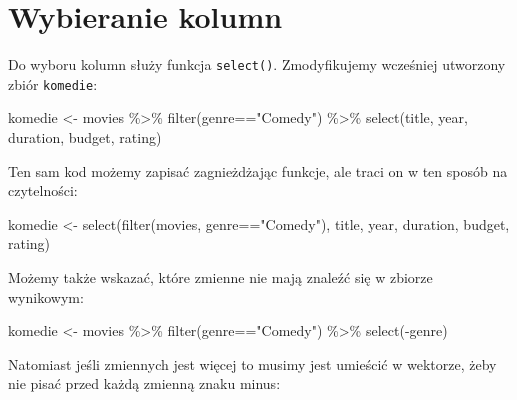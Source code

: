 \documentclass[
  letterpaper,
  DIV=11,
  numbers=noendperiod]{scrreprt}
\newenvironment{Shaded}{\begin{snugshade}}{\end{snugshade}}
\newcommand{\FunctionTok}[1]{\textcolor[rgb]{0.28,0.35,0.67}{#1}}
\newcommand{\NormalTok}[1]{\textcolor[rgb]{0.00,0.23,0.31}{#1}}
\newcommand{\OtherTok}[1]{\textcolor[rgb]{0.00,0.23,0.31}{#1}}
\newcommand{\SpecialCharTok}[1]{\textcolor[rgb]{0.37,0.37,0.37}{#1}}
\newcommand{\StringTok}[1]{\textcolor[rgb]{0.13,0.47,0.30}{#1}}
\begin{document}
\hypertarget{wybieranie-kolumn}{%
\section{Wybieranie kolumn}\label{wybieranie-kolumn}}

Do wyboru kolumn służy funkcja \texttt{select()}. Zmodyfikujemy
wcześniej utworzony zbiór \texttt{komedie}:

\begin{Shaded}
\begin{Highlighting}[]
\NormalTok{komedie }\OtherTok{\textless{}{-}}\NormalTok{ movies }\SpecialCharTok{\%\textgreater{}\%}
  \FunctionTok{filter}\NormalTok{(genre}\SpecialCharTok{==}\StringTok{"Comedy"}\NormalTok{) }\SpecialCharTok{\%\textgreater{}\%}
  \FunctionTok{select}\NormalTok{(title, year, duration, budget, rating)}
\end{Highlighting}
\end{Shaded}

Ten sam kod możemy zapisać zagnieżdżając funkcje, ale traci on w ten
sposób na czytelności:

\begin{Shaded}
\begin{Highlighting}[]
\NormalTok{komedie }\OtherTok{\textless{}{-}} \FunctionTok{select}\NormalTok{(}\FunctionTok{filter}\NormalTok{(movies, genre}\SpecialCharTok{==}\StringTok{"Comedy"}\NormalTok{), title, year, duration, budget, rating)}
\end{Highlighting}
\end{Shaded}

Możemy także wskazać, które zmienne nie mają znaleźć się w zbiorze
wynikowym:

\begin{Shaded}
\begin{Highlighting}[]
\NormalTok{komedie }\OtherTok{\textless{}{-}}\NormalTok{ movies }\SpecialCharTok{\%\textgreater{}\%}
  \FunctionTok{filter}\NormalTok{(genre}\SpecialCharTok{==}\StringTok{"Comedy"}\NormalTok{) }\SpecialCharTok{\%\textgreater{}\%}
  \FunctionTok{select}\NormalTok{(}\SpecialCharTok{{-}}\NormalTok{genre)}
\end{Highlighting}
\end{Shaded}

Natomiast jeśli zmiennych jest więcej to musimy jest umieścić w
wektorze, żeby nie pisać przed każdą zmienną znaku minus:
\end{document}
